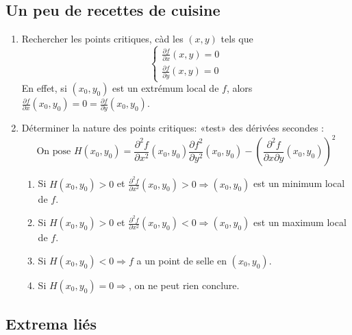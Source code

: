 \subsection{Un peu de recettes de cuisine}

\begin{enumerate}
    \item Rechercher les points critiques, càd les \( (x,y)\) tels que
        \[  \begin{cases} \frac{\partial f}{\partial x}(x,y) = 0      \\
            \frac{\partial f}{\partial y}(x,y) = 0
        \end{cases} \]
        En effet, si \( (x_0,y_0)\) est un extrémum local de \( f\), alors \( \frac{\partial f}{\partial x}(x_0,y_0) = 0 = \frac{\partial f}{\partial y}(x_0,y_0)\).
    \item Déterminer la nature des points critiques: «test» des dérivées secondes :
        \[\text{On pose }H(x_0,y_0) = \frac{\partial^2 f}{\partial x^2}(x_0,y_0)\frac{\partial f^2}{\partial y^2}(x_0,y_0) - \left(\frac{\partial^2 f}{\partial x\partial y}(x_0,y_0)\right)^2\]
        \begin{enumerate}
            \item Si \( H(x_0,y_0) > 0\) et \( \frac{\partial^2 f}{\partial x^2}(x_0,y_0) > 0 \Longrightarrow (x_0,y_0)\) est un minimum local de \( f\).
            \item Si \( H(x_0,y_0) > 0\) et \( \frac{\partial^2 f}{\partial x^2}(x_0,y_0) < 0 \Longrightarrow (x_0,y_0)\) est un maximum local de \( f\).
            \item Si \( H(x_0,y_0) < 0 \Longrightarrow f\) a un point de selle en \( (x_0,y_0)\).
            \item Si \( H(x_0,y_0) = 0 \Longrightarrow\), on ne peut rien conclure.
        \end{enumerate}
\end{enumerate}

\subsection{Extrema liés}

